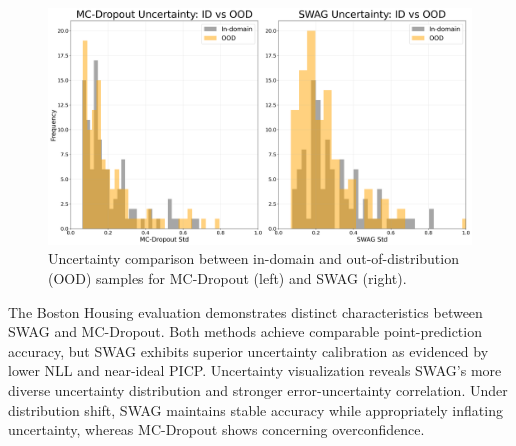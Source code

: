 \begin{figure}[ht]
    \centering
    \includegraphics[width=0.9\linewidth]{plots/bh_ood_comp.png}
    \caption{Uncertainty comparison between in-domain and out-of-distribution (OOD) samples for MC-Dropout (left) and SWAG (right).}
    \label{fig:bh_ood_comp}
\end{figure}

\FloatBarrier

The Boston Housing evaluation demonstrates distinct characteristics between SWAG and MC-Dropout.
Both methods achieve comparable point-prediction accuracy, but SWAG exhibits superior uncertainty
calibration as evidenced by lower NLL and near-ideal PICP. Uncertainty visualization reveals SWAG's more
diverse uncertainty distribution and stronger error-uncertainty correlation. Under distribution shift,
SWAG maintains stable accuracy while appropriately inflating uncertainty, whereas MC-Dropout shows
concerning overconfidence.
